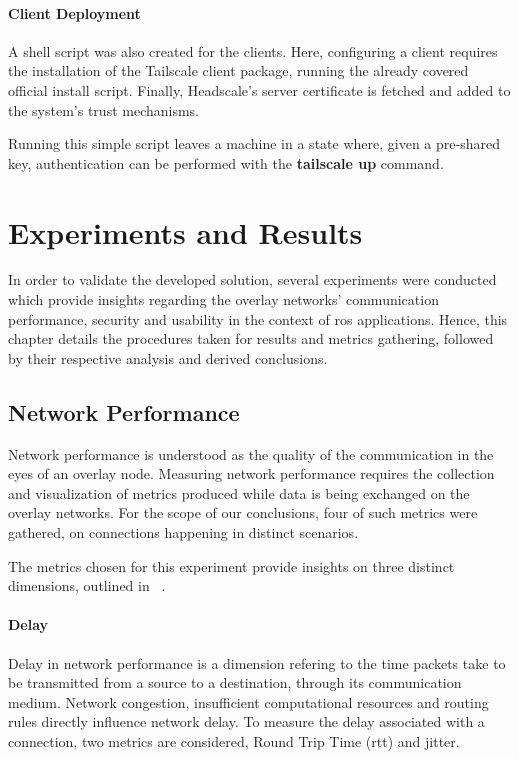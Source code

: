 \documentclass[11pt,twoside,a4paper]{report}
\begin{document}
\subsubsection{Client Deployment}

A shell script was also created for the clients. Here, configuring a client requires the installation of the Tailscale client package, running the already covered official install script. Finally, Headscale's server certificate is fetched and added to the system's trust mechanisms.

Running this simple script leaves a machine in a state where, given a pre-shared key, authentication can be performed with the \textbf{tailscale up} command.

\chapter{Experiments and Results}
\label{chap:results}

In order to validate the developed solution, several experiments were conducted which provide insights regarding the overlay networks' communication performance, security and usability in the context of \ac{ros} applications. Hence, this chapter details the procedures taken for results and metrics gathering, followed by their respective analysis and derived conclusions.

\section{Network Performance}

Network performance is understood as the quality of the communication in the eyes of an overlay node. Measuring network performance requires the collection  and visualization of metrics produced while data is being exchanged on the overlay networks. For the scope of our conclusions, four of such metrics were gathered, on connections happening in distinct scenarios.

The metrics chosen for this experiment provide insights on three distinct dimensions, outlined in ~\cite{livronet, Hanemann2006}.

\subsubsection{Delay}

Delay in network performance is a dimension refering to the time packets take to be transmitted from a source to a destination, through its communication medium. Network congestion, insufficient computational resources and routing rules directly influence network delay. To measure the delay associated with a connection, two metrics are considered, Round Trip Time (\ac{rtt}) and jitter.
\end{document}
